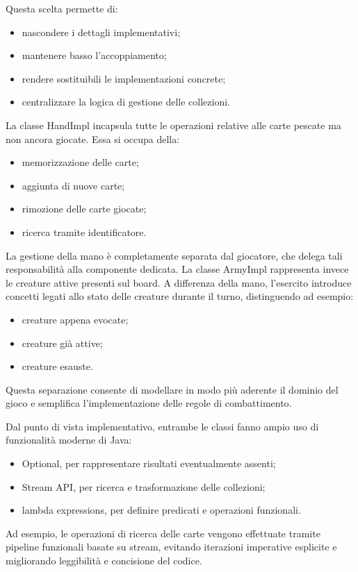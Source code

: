 Questa scelta permette di:
\begin{itemize}
\item nascondere i dettagli implementativi;
\item mantenere basso l'accoppiamento;
\item rendere sostituibili le implementazioni concrete;
\item centralizzare la logica di gestione delle collezioni.
\end{itemize}

La classe HandImpl incapsula tutte le operazioni relative alle carte pescate
ma non ancora giocate. Essa si occupa della:
\begin{itemize}
\item memorizzazione delle carte;
\item aggiunta di nuove carte;
\item rimozione delle carte giocate;
\item ricerca tramite identificatore.
\end{itemize}

La gestione della mano è completamente separata dal giocatore, che delega
tali responsabilità alla componente dedicata.
La classe ArmyImpl rappresenta invece le creature attive presenti sul board.
A differenza della mano, l'esercito introduce concetti legati allo stato delle
creature durante il turno, distinguendo ad esempio:
\begin{itemize}
\item creature appena evocate;
\item creature già attive;
\item creature esauste.
\end{itemize}

Questa separazione consente di modellare in modo più aderente il dominio del gioco
e semplifica l'implementazione delle regole di combattimento.

Dal punto di vista implementativo,
entrambe le classi fanno ampio uso di funzionalità moderne di Java:
\begin{itemize}
\item Optional, per rappresentare risultati eventualmente assenti;
\item Stream API, per ricerca e trasformazione delle collezioni;
\item lambda expressions, per definire predicati e operazioni funzionali.
\end{itemize}

Ad esempio, le operazioni di ricerca delle carte vengono effettuate tramite
pipeline funzionali basate su stream, evitando iterazioni imperative
esplicite e migliorando leggibilità e concisione del codice.

